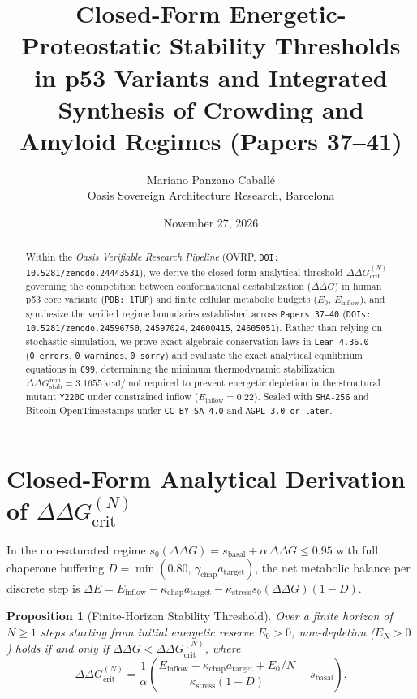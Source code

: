 \documentclass[11pt,a4paper]{article}
\title{Closed-Form Energetic-Proteostatic Stability Thresholds in p53 Variants and Integrated Synthesis of Crowding and Amyloid Regimes (Papers 37--41)}
\author{Mariano Panzano Caball\'e \\ \small Oasis Sovereign Architecture Research, Barcelona}
\date{November 27, 2026}
\newtheorem{proposition}{Proposition}
\begin{document}
\maketitle

\begin{abstract}
Within the \emph{Oasis Verifiable Research Pipeline} (OVRP, \texttt{DOI: 10.5281/zenodo.24443531}), we derive the closed-form analytical threshold $\Delta\Delta G_{\mathrm{crit}}^{(N)}$ governing the competition between conformational destabilization ($\Delta\Delta G$) in human p53 core variants (\texttt{PDB: 1TUP}) and finite cellular metabolic budgets ($E_0$, $E_{\mathrm{inflow}}$), and synthesize the verified regime boundaries established across \texttt{Papers~37--40} (\texttt{DOIs: 10.5281/zenodo.24596750}, \texttt{24597024}, \texttt{24600415}, \texttt{24605051}). Rather than relying on stochastic simulation, we prove exact algebraic conservation laws in \texttt{Lean~4.36.0} (\texttt{0~errors}, \texttt{0~warnings}, \texttt{0~sorry}) and evaluate the exact analytical equilibrium equations in \texttt{C99}, determining the minimum thermodynamic stabilization $\Delta\Delta G_{\mathrm{stab}}^{\min} = 3.1655\,\mathrm{kcal/mol}$ required to prevent energetic depletion in the structural mutant \texttt{Y220C} under constrained inflow ($E_{\mathrm{inflow}} = 0.22$). Sealed with \texttt{SHA-256} and Bitcoin OpenTimestamps under \texttt{CC-BY-SA-4.0} and \texttt{AGPL-3.0-or-later}.
\end{abstract}

\section{Closed-Form Analytical Derivation of $\Delta\Delta G_{\mathrm{crit}}^{(N)}$}
In the non-saturated regime $s_0(\Delta\Delta G) = s_{\mathrm{basal}} + \alpha\,\Delta\Delta G \le 0.95$ with full chaperone buffering $D = \min(0.80,\, \gamma_{\mathrm{chap}} a_{\mathrm{target}})$, the net metabolic balance per discrete step is $\Delta E = E_{\mathrm{inflow}} - \kappa_{\mathrm{chap}} a_{\mathrm{target}} - \kappa_{\mathrm{stress}} s_0(\Delta\Delta G)(1 - D)$.

\begin{proposition}[Finite-Horizon Stability Threshold]
Over a finite horizon of $N \ge 1$ steps starting from initial energetic reserve $E_0 > 0$, non-depletion ($E_N > 0$) holds if and only if $\Delta\Delta G < \Delta\Delta G_{\mathrm{crit}}^{(N)}$, where
\begin{equation}
\Delta\Delta G_{\mathrm{crit}}^{(N)} = \frac{1}{\alpha}\left(\frac{E_{\mathrm{inflow}} - \kappa_{\mathrm{chap}} a_{\mathrm{target}} + E_0/N}{\kappa_{\mathrm{stress}}(1 - D)} - s_{\mathrm{basal}}\right).
\end{equation}
\end{proposition}
\end{document}
